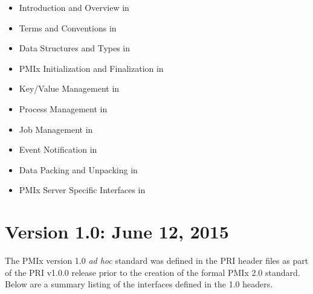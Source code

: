 \begin{itemize}
\item Introduction and Overview in 
\item Terms and Conventions in 
\item Data Structures and Types in 
\item \ac{PMIx} Initialization and Finalization in 
\item Key/Value Management in 
\item Process Management in 
\item Job Management in 
\item Event Notification in 
\item Data Packing and Unpacking in 
\item \ac{PMIx} Server Specific Interfaces in 
\end{itemize}

\section{Version 1.0: June 12, 2015}

\par
The \ac{PMIx} version 1.0 \textit{ad hoc} standard was defined in the \acf{PRI} header files as part of the \ac{PRI} v1.0.0 release prior to the creation of the formal \ac{PMIx} 2.0 standard.
Below are a summary listing of the interfaces defined in the 1.0 headers.

